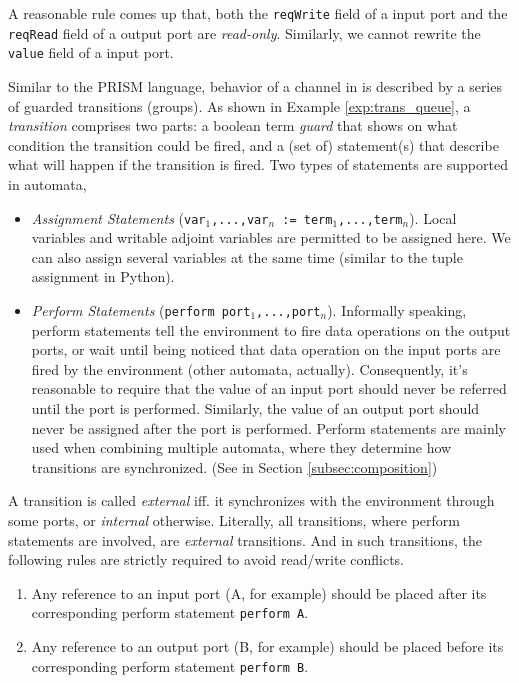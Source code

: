 A reasonable rule comes up that, both the \texttt{reqWrite} field of a input port and the \texttt{reqRead} field of a output port are \emph{read-only}. Similarly, we cannot rewrite the \texttt{value} field of a input port.

 Similar to the PRISM\cite{KwiatkowskaCav2011} language, behavior of a channel in \lang{} is described by a series of guarded transitions (groups). As shown in  Example \ref{exp:trans_queue}, a \emph{transition} comprises two parts: a boolean term \emph{guard} that shows on what condition the transition could be fired, and a (set of) statement(s) that describe what will happen if the transition is fired. Two types of statements are supported in automata,
\begin{itemize}
    \item \emph{Assignment Statements} (\texttt{var$_1$,...,var$_n$ := term$_1$,...,term$_n$}). Local variables and writable adjoint variables are permitted to be assigned here. We can also assign several variables at the same time (similar to the tuple assignment in Python).
    \item \emph{Perform Statements} (\texttt{perform port$_1$,...,port$_n$}). Informally speaking, perform statements tell the environment to fire data operations on the output ports, or wait until being noticed that data operation on the input ports are fired by the environment (other automata, actually). Consequently, it's reasonable to require that the value of an input port should never be referred until the port is performed. Similarly, the value of an output port should never be assigned after the port is performed. Perform statements are mainly used when combining multiple automata, where they determine how transitions are synchronized. (See in Section \ref{subsec:composition})
\end{itemize}

A transition is called \emph{external} iff. it synchronizes with the environment through some ports, or \emph{internal} otherwise. Literally, all transitions, where perform statements are involved, are \emph{external} transitions. And in such transitions, the following rules are strictly required to avoid read/write conflicts.

\begin{enumerate}
    \item Any reference to an input port (A, for example) should be placed after its corresponding perform statement \texttt{perform A}.
    \item Any reference to an output port (B, for example) should be placed before its corresponding perform statement \texttt{perform B}.
\end{enumerate}

